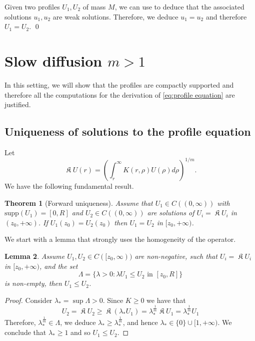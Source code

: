 \documentclass[a4paper]{article}
\newtheorem{theorem}{Theorem}[section]
\newtheorem{lemma}[theorem]{Lemma}
\theoremstyle{definition}
\DeclareMathOperator{\fixedpoint}{\mathfrak K}
\begin{document}
Given two profiles $U_1, U_2$ of mass $M$, we can use  to deduce that the associated solutions $u_1, u_2$ are weak solutions. Therefore, we deduce $u_1 = u_2$ and therefore $U_1 = U_2$.
\qed

%

\section{Slow diffusion $m>1$}
In this setting, we will show that the profiles are compactly supported and therefore all the computations for the derivation of \eqref{eq:profile equation} are justified.
\subsection{Uniqueness of solutions to the profile equation}
Let
\begin{equation*}
\fixedpoint U (r) = \left( \int_{r}^\infty K(r, \rho) U(\rho) d\rho  \right)^{1/m}.
\end{equation*}
We have the following fundamental result.
\begin{theorem}[Forward uniqueness]
\label{thm:profile forward uniqueness}
Assume that $U_1 \in C((0,\infty))$ with $\text{supp}(U_1) = [0,R]$ and $U_2 \in C((0,\infty))$ are solutions of $U_i = \fixedpoint U_i$ in $(z_0, +\infty)$. If $U_1(z_0) = U_2(z_0)$ then $U_1 = U_2$ in $[z_0,+\infty)$.
\end{theorem}

%
%
%
%
%
%
%
%
%
%

We start with a lemma that strongly uses the homogeneity of the operator.
\begin{lemma}
\label{lem:comparison by homogeneity}
Assume $U_1, U_2 \in C([z_0,\infty))$ are non-negative, such that $U_i = \fixedpoint U_i$ in $[z_0,+\infty)$, and the set
\[
  \Lambda = \{ \lambda > 0 : \lambda U_1 \le U_2 \text{ in } [z_0,R] \}
\]
is non-empty, then $U_1 \le U_2$.
\end{lemma}
\begin{proof}
Consider $\lambda_* = \sup \Lambda > 0$. Since $K \ge 0$ we have that
\begin{equation*}
  U_2 = \fixedpoint U_2 \ge \fixedpoint (\lambda_* U_1) = \lambda_*^{\frac 1 {m}} \fixedpoint U_1 = \lambda_*^{\frac 1 {m}} U_1
\end{equation*}
Therefore, $\lambda_*^{\frac 1 {m}} \in \Lambda$, we deduce $\lambda_* \ge \lambda_*^{\frac 1 {m}}$, and hence $\lambda_* \in \{0\} \cup [1,+\infty)$. We conclude that $\lambda_* \ge 1$ and so $U_1 \le U_2$.
\end{proof}
\end{document}
